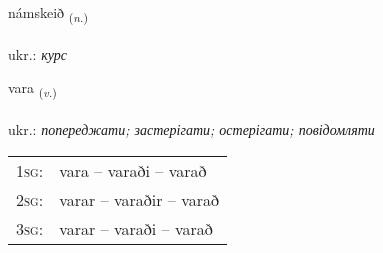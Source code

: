 \documentclass[frontgrid, backgrid]{flacards}\usepackage[]{graphicx}\usepackage[]{xcolor}
\begin{document}
\renewcommand{\flhead}{\vskip5pt \fboxsep=0pt {\small\bfseries\footnotesize Nafnorð | іменник}}
\renewcommand{\fcfoot}{\vskip5pt \fboxsep=0pt \hspace{2pt}{\small\bfseries\footnotesize 2K}}

\renewcommand{\blhead}{\vskip5pt {\small\bfseries\footnotesize Nafnorð | іменник }}
\renewcommand{\bcfoot}{\vskip5pt \hspace{2pt}{\small\bfseries\footnotesize 2K}}


{námskeið \small{\textsubscript{(\textit{n.})}} \\[1ex] %
\textphonetic{[naumsceið]} \\
ukr.: \emph{курс} \\  [2ex]
\renewcommand*{\arraystretch}{0.8}
}

\renewcommand{\flhead}{\vskip5pt \fboxsep=0pt {\small\bfseries\footnotesize Sagnorð | дієслово}}
\renewcommand{\fcfoot}{\vskip5pt \fboxsep=0pt \hspace{2pt}{\small\bfseries\footnotesize 2K}}

\renewcommand{\blhead}{\vskip5pt {\small\bfseries\footnotesize Sagnorð | дієслово }}
\renewcommand{\bcfoot}{\vskip5pt \hspace{2pt}{\small\bfseries\footnotesize 2K}}


{vara \small{\textsubscript{(\textit{v.})}} \\[1ex] %
\textphonetic{[vaːra]} \\
ukr.: \emph{попереджати; застерігати; остерігати; повідомляти} \\  [2ex]
\renewcommand*{\arraystretch}{0.8}
\begin{tabular}{p{1cm}l}
\textsc{1sg}: & vara -- varaði -- varað \\ 
\textsc{2sg}: & varar -- varaðir -- varað \\ 
\textsc{3sg}: & varar -- varaði -- varað \\ 
\end{tabular}
}
\end{document}
